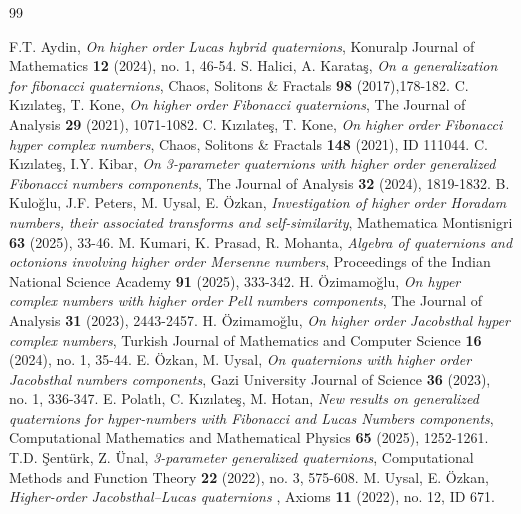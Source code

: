 \documentclass{kms-c}
\theoremstyle{plain}
\theoremstyle{definition}
\theoremstyle{remark}
\begin{document}
\begin{thebibliography}{99}

F.T. Aydin, {\it On higher order Lucas hybrid quaternions}, Konuralp Journal of Mathematics {\bf 12} (2024), no. 1, 46-54.
S. Halici, A. Karata\c{s}, {\it On a generalization for fibonacci quaternions}, Chaos, Solitons \& Fractals {\bf 98} (2017),178-182.
C. K\i z\i late\c{s}, T. Kone, {\it On higher order Fibonacci quaternions}, The Journal of Analysis {\bf 29} (2021), 1071-1082.
C. K\i z\i late\c{s}, T. Kone, {\it On higher order Fibonacci hyper complex numbers}, Chaos, Solitons \& Fractals {\bf 148} (2021), ID 111044.
C. K\i z\i late\c{s}, I.Y. Kibar, {\it On 3-parameter quaternions with higher order generalized Fibonacci numbers components}, The Journal of Analysis {\bf 32} (2024), 1819-1832. 
B. Kulo\u{g}lu, J.F. Peters, M. Uysal, E. \"Ozkan, {\it Investigation of higher order Horadam numbers, their associated transforms and self-similarity}, Mathematica Montisnigri {\bf 63} (2025), 33-46.
M. Kumari, K. Prasad, R. Mohanta, {\it Algebra of quaternions and octonions involving higher order Mersenne numbers}, Proceedings of the Indian National Science Academy {\bf 91} (2025), 333-342. 
H. \"Ozimamo\u{g}lu, {\it On hyper complex numbers with higher order Pell numbers components}, The Journal of Analysis {\bf 31} (2023), 2443-2457. 
H. \"Ozimamo\u{g}lu, {\it On higher order Jacobsthal hyper complex numbers}, Turkish Journal of Mathematics and Computer Science {\bf 16} (2024), no. 1, 35-44.
E. \"Ozkan, M. Uysal, {\it On quaternions with higher order Jacobsthal numbers components}, Gazi University Journal of Science {\bf 36} (2023), no. 1, 336-347.
E. Polatl\i, C. K\i z\i late\c{s}, M. Hotan, {\it New results on generalized quaternions for hyper-numbers with Fibonacci and Lucas Numbers components},  Computational Mathematics and Mathematical Physics {\bf 65} (2025), 1252-1261.
T.D. \c{S}ent\"urk, Z. \"Unal, {\it 3-parameter generalized quaternions}, Computational Methods and Function Theory {\bf 22} (2022), no. 3, 575-608.
M. Uysal, E. \"Ozkan, {\it Higher-order Jacobsthal--Lucas quaternions }, Axioms {\bf 11} (2022), no. 12, ID 671.
\end{thebibliography}
\end{document}
